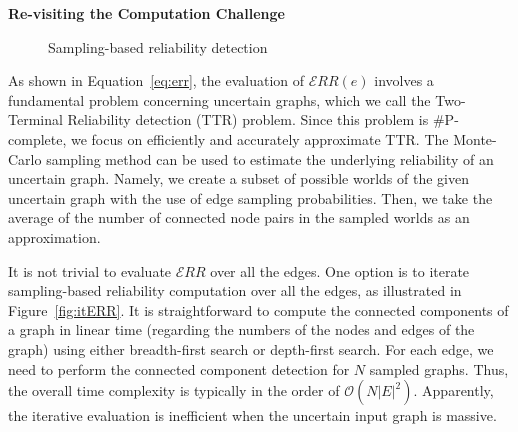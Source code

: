 \textbf{Re-visiting the Computation Challenge}~~
\begin{figure}
    \vspace{-10pt}
    \caption{Sampling-based reliability detection}
    \vspace{-5pt}
    \label{fig:computationERR}
\end{figure} 
As shown in Equation~\ref{eq:err},  
the evaluation of $\mathcal{E}RR(e)$ involves a fundamental problem concerning uncertain graphs, which we call 
the Two-Terminal Reliability detection (TTR) problem. 
Since this problem is \#P-complete, we focus on efficiently and accurately approximate TTR.
The Monte-Carlo sampling method can be used to estimate the underlying reliability of an uncertain graph. 
Namely, we create a subset of possible worlds of the given uncertain graph with the use of edge sampling probabilities. 
Then, we take the average of the number of connected node pairs in the sampled worlds as an approximation. 
 
It is not trivial to evaluate $\mathcal{E}RR$ over all the edges. 
One option is to iterate sampling-based reliability computation over all the edges, 
as illustrated in Figure~\ref{fig:itERR}. 
It is straightforward to compute the connected components of a graph in linear time (regarding the numbers of the nodes and edges of the graph) using either breadth-first search or depth-first search.
For each edge, we need to perform the connected component detection for $N$ sampled graphs.
Thus, the overall time complexity is typically in the order of $\mathcal{O}( N |E|^{2})$.
Apparently, the iterative evaluation is inefficient when the uncertain input graph is massive.

